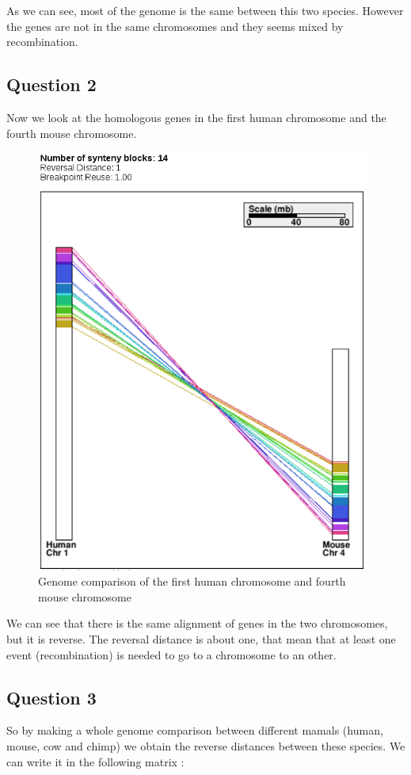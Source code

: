 \documentclass[]{article}
\begin{document}
As we can see, most of the genome is the same between this two species. However the genes are not in the same chromosomes and they seems mixed by recombination.


\subsection{Question 2}
Now we look at the homologous genes in the first human chromosome and the fourth mouse chromosome.
\begin{figure}[H]
	\includegraphics*[width = 11cm]{../H1_M4.png}
	\caption{\label{h1_m4} Genome comparison of the first human chromosome and fourth mouse chromosome }
\end{figure}
	We can see that there is the same alignment of genes in the two chromosomes, but it is reverse. The reversal distance is about one, that mean that at least one event (recombination) is needed to go to a chromosome to an other.   
\subsection{Question 3}

	So by making a whole genome comparison between different mamals (human, mouse, cow and chimp) we obtain the reverse distances between these species. We can write it in the following matrix :
	\\
	
\end{document}
